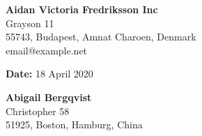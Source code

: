 \documentclass[a4paper]{letter}
\begin{document}
\RaggedRight
%
\begin{minipage}[t]{0.5\textwidth}
	\begin{flushleft}

	\end{flushleft}
\end{minipage}%
\begin{minipage}[t]{0.5\textwidth}
 	\begin{flushright}
		\textbf{\huge  Aidan Victoria Fredriksson Inc} \\
		{\large Grayson 11}\\
		{\large 55743, Budapest, Amnat Charoen, Denmark}\\
		{\large email@example.net}
	
 	\end{flushright}
\end{minipage}%

\begin{minipage}[t]{0.5\textwidth}
	\begin{flushleft}

	\end{flushleft}
\end{minipage}%
\begin{minipage}[t]{0.5\textwidth}
 	\begin{flushright}
		\textbf{\large Date:} 18 April 2020\\		
 	\end{flushright}
\end{minipage}%

\begin{minipage}[t]{0.5\textwidth}
	\begin{flushleft}
	 	\textbf{\large Abigail Bergqvist } \\
		{\large Christopher 58}\\
		{\large 51925, Boston, Hamburg, China }\\
	\end{flushleft}
\end{minipage}
\begin{minipage}[t]{0.5\textwidth}
 	\begin{flushright} 	
	
 	\end{flushright}
\end{minipage}%
\end{document}
